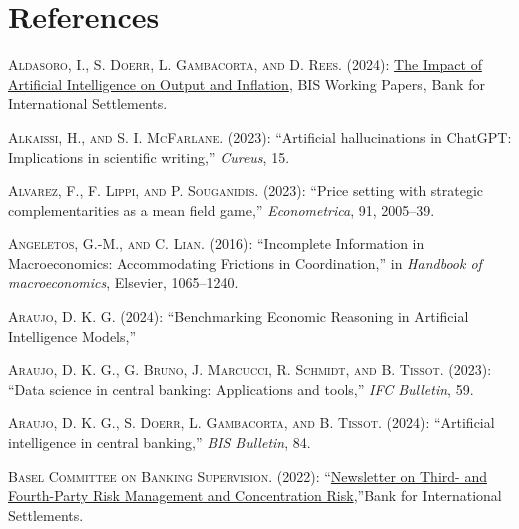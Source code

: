 \documentclass[
]{article}
\newlength{\cslhangindent}
\newlength{\cslentryspacingunit} %
\newenvironment{CSLReferences}[2] %
 {%
  \setlength{\parindent}{0pt}
  \ifodd #1
  \let\oldpar\par
  \def\par{\hangindent=\cslhangindent\oldpar}
  \fi
  \setlength{\parskip}{#2\cslentryspacingunit}
 }%
 {}
\theoremstyle{plain}
\theoremstyle{definition}
\theoremstyle{remark}
\begin{document}
\hypertarget{references}{%
\section*{References}\label{references}}

\hypertarget{refs}{}
\begin{CSLReferences}{1}{0}
\leavevmode{}%
\textsc{Aldasoro, I., S. Doerr, L. Gambacorta, and D. Rees}. (2024):
\href{https://www.bis.org/publ/work1179.htm}{The Impact of Artificial
Intelligence on Output and Inflation}, BIS Working Papers, Bank for
International Settlements.

\leavevmode{}%
\textsc{Alkaissi, H., and S. I. McFarlane}. (2023): {``Artificial
hallucinations in ChatGPT: Implications in scientific writing,''}
\emph{Cureus}, 15.

\leavevmode{}%
\textsc{Alvarez, F., F. Lippi, and P. Souganidis}. (2023): {``Price
setting with strategic complementarities as a mean field game,''}
\emph{Econometrica}, 91, 2005--39.

\leavevmode{}%
\textsc{Angeletos, G.-M., and C. Lian}. (2016): {``Incomplete
Information in Macroeconomics: Accommodating Frictions in
Coordination,''} in \emph{Handbook of macroeconomics}, Elsevier,
1065--1240.

\leavevmode{}%
\textsc{Araujo, D. K. G.} (2024): {``Benchmarking Economic Reasoning in
Artificial Intelligence Models,''}

\leavevmode{}%
\textsc{Araujo, D. K. G., G. Bruno, J. Marcucci, R. Schmidt, and B.
Tissot}. (2023): {``Data science in central banking: Applications and
tools,''} \emph{IFC Bulletin}, 59.

\leavevmode{}%
\textsc{Araujo, D. K. G., S. Doerr, L. Gambacorta, and B. Tissot}.
(2024): {``Artificial intelligence in central banking,''} \emph{BIS
Bulletin}, 84.

\leavevmode{}%
\textsc{Basel Committee on Banking Supervision}. (2022):
{``\href{https://www.bis.org}{{Newsletter on Third- and Fourth-Party
Risk Management and Concentration Risk}},''}{Bank for International
Settlements}.


\end{CSLReferences}
\end{document}
